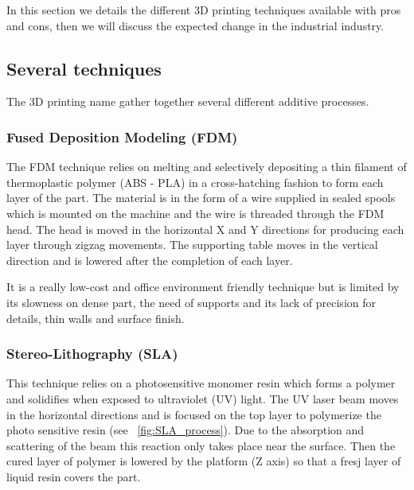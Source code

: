 In this section we details the different 3D printing techniques available with pros and cons, then we will discuss the expected change in the industrial industry.

\subsection{Several techniques} %

The 3D printing name gather together several different additive processes.

\subsubsection{Fused Deposition Modeling (FDM)} %

The FDM technique relies on melting and selectively depositing a thin filament of thermoplastic polymer (ABS - PLA) in a cross-hatching fashion to form each layer of the part. The material is in the form of a wire supplied in sealed spools which is mounted on the machine and the wire is threaded through the FDM head. The head is moved in the horizontal X and Y directions for producing each layer through zigzag movements. The supporting table moves in the vertical direction and is lowered after the completion of each layer.

\begin{figure}[h]
    \centering
        \hfil
        \hfil
    \caption{}
    \label{fig:FDM_technique}
\end{figure}

It is a really low-cost and office environment friendly technique but is limited by its slowness on dense part, the need of supports and its lack of precision for details, thin walls and surface finish.


\subsubsection{Stereo-Lithography (SLA)} %

This technique relies on a photosensitive monomer resin which forms a polymer and solidifies when exposed to ultraviolet (UV) light. The UV laser beam moves in the horizontal directions and is focused on the top layer to polymerize the photo sensitive resin (see \figurename~\ref{fig:SLA_process}). Due to the absorption and scattering of the beam this reaction only takes place near the surface. Then the cured layer of polymer is lowered by the platform (Z axis) so that a fresj layer of liquid resin covers the part.

